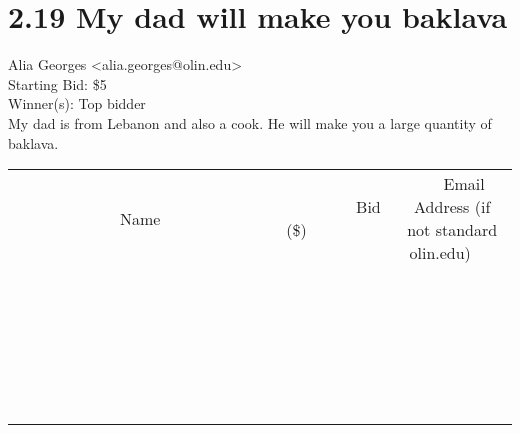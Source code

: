 \documentclass[11pt]{article}
\begin{document}
					\section*{2.19 My dad will make you baklava}
					Alia Georges <alia.georges@olin.edu> \\
					Starting Bid: \$5 \\
					Winner(s): Top bidder \\
					My dad is from Lebanon and also a cook. He will make you a large quantity of baklava. \\
					[6ex]
					\begin{tabular}{c c c}
						~~~~~~~~~~~~~Name~~~~~~~~~~~~~ & ~~~~~~~~~Bid (\$)~~~~~~~~~ & ~~~Email Address (if not standard olin.edu)~~~ \\
				
 & & \\
\hline
 & & \\
\hline
 & & \\
\hline
 & & \\
\hline
 & & \\
\hline
 & & \\
\hline
 & & \\
\hline
 & & \\
\hline
 & & \\
\hline
 & & \\
\hline
 & & \\
\hline
 & & \\
\hline
 & & \\
\hline
 & & \\
\hline
 & & \\
\hline
 & & \\
\hline
 & & \\
\hline
 & & \\
\hline
 & & \\
\hline
 & & \\
\hline
 & & \\
\hline
 & & \\
\hline
 & & \\
\hline
 & & \\
\hline
 & & \\
\hline
 & & \\
\hline
					\end{tabular}
					\clearpage
				
\end{document}

